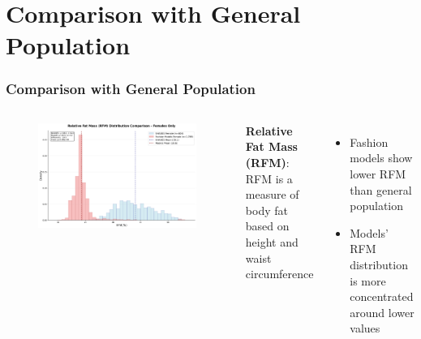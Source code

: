 \documentclass[aspectratio=169,xcolor=dvipsnames,10pt]{beamer}
\begin{document}
\section{Comparison with General Population}

\begin{frame}[t]
    \frametitle{Comparison with General Population}
    \begin{columns}
            \begin{figure}
                    \begin{center}
                    \includegraphics[width=\textwidth]{figures/rfm_female_distribution_comparison.png}
                    \end{center}
                \end{figure}

        \textbf{Relative Fat Mass (RFM)}: \\
            RFM is a measure of body fat based on height and waist circumference
            \begin{itemize}
                \setlength{\itemsep}{0.6em}
                \pause \item Fashion models show lower RFM than general population
                \pause \item Models' RFM distribution is more concentrated around lower values
            \end{itemize}
    
    \end{columns}

\end{frame}
\end{document}
